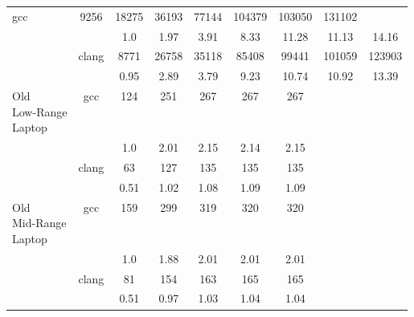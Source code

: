 \begin{table}[H]
\begin{tabularx}{\linewidth}{X c c c c c c c c}
\multirow{2}{*}{gcc} & 9256 & 18275 & 36193 & 77144 & 104379 & 103050 & 131102\\
 & & 1.0 & 1.97 & 3.91 & 8.33 & 11.28 & 11.13 & 14.16\\
\cmidrule[0.05em](){3-9} & 
\multirow{2}{*}{clang} & 8771 & 26758 & 35118 & 85408 & 99441 & 101059 & 123903\\
 & & 0.95 & 2.89 & 3.79 & 9.23 & 10.74 & 10.92 & 13.39\\
            \midrule
\multirowcell{4}{Old\\ Low-Range\\ Laptop} & 
\multirow{2}{*}{gcc} & 124 & 251 & 267 & 267 & 267\\
 & & 1.0 & 2.01 & 2.15 & 2.14 & 2.15\\
\cmidrule[0.05em](){3-9} & 
\multirow{2}{*}{clang} & 63 & 127 & 135 & 135 & 135\\
 & & 0.51 & 1.02 & 1.08 & 1.09 & 1.09\\
            \midrule
\multirowcell{4}{Old\\ Mid-Range\\ Laptop} & 
\multirow{2}{*}{gcc} & 159 & 299 & 319 & 320 & 320\\
 & & 1.0 & 1.88 & 2.01 & 2.01 & 2.01\\
\cmidrule[0.05em](){3-9} & 
\multirow{2}{*}{clang} & 81 & 154 & 163 & 165 & 165\\
 & & 0.51 & 0.97 & 1.03 & 1.04 & 1.04 \\
            \bottomrule
        \end{tabularx}
    \end{table}
    